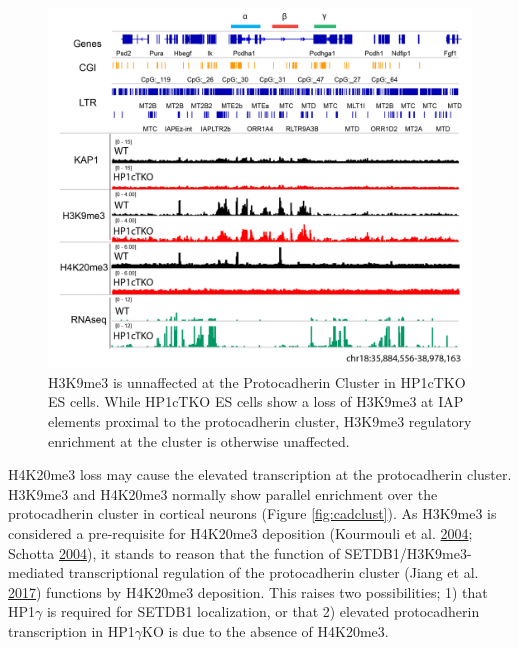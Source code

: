 \documentclass[onehalf,12pt]{beavtex}
\begin{document}
  \begin{figure}
  
  {\centering \includegraphics[width=1\linewidth, ]{./figure/discussion/ES_Pcdh_H3K9_H4K20} 
  
  }
  
  \caption[H3K9me3 is unnaffected at the Protocadherin Cluster in HP1cTKO ES cells]{H3K9me3 is unnaffected at the Protocadherin Cluster in HP1cTKO ES cells. While HP1cTKO ES cells show a loss of H3K9me3 at IAP elements proximal to the protocadherin cluster, H3K9me3 regulatory enrichment at the cluster is otherwise unaffected.}\label{fig:EScadclust}
  \end{figure}
  
  \FloatBarrier
  H4K20me3 loss may cause the elevated transcription at the protocadherin
  cluster. H3K9me3 and H4K20me3 normally show parallel enrichment over the
  protocadherin cluster in cortical neurons (Figure \ref{fig:cadclust}).
  As H3K9me3 is considered a pre-requisite for H4K20me3 deposition
  (Kourmouli et al.
  \protect\hyperlink{ref-KourmouliHeterochromatintrimethylatedlysine2004}{2004};
  Schotta
  \protect\hyperlink{ref-Schottasilencingpathwayinduce2004}{2004}), it
  stands to reason that the function of SETDB1/H3K9me3-mediated
  transcriptional regulation of the protocadherin cluster (Jiang et al.
  \protect\hyperlink{ref-JiangmethyltransferaseSETDB1regulates2017}{2017})
  functions by H4K20me3 deposition. This raises two possibilities; 1) that
  HP1\(\gamma\) is required for SETDB1 localization, or that 2) elevated
  protocadherin transcription in HP1\(\gamma\)KO is due to the absence of
  H4K20me3.
  
\end{document}
